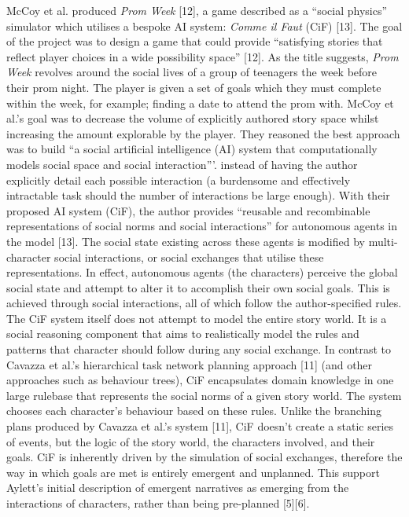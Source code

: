 \documentclass{sig-alternate-05-2015}
\begin{document}
\newline McCoy et al. produced \textit{Prom Week} [12], a game described as a ``social physics'' simulator which utilises a bespoke AI system: \textit{Comme il Faut} (CiF) [13]. The goal of the project was to design a game that could provide ``satisfying stories that reflect player choices in a wide possibility space'' [12].
As the title suggests, \textit{Prom Week} revolves around the social lives of a group of teenagers the week before their prom night. The player is given a set of goals which they must complete within the week, for example; finding a date to attend the prom with. McCoy et al.'s goal was to decrease the volume of explicitly authored story space whilst increasing the amount explorable by the player. They reasoned the best approach was to build ``a social artificial intelligence (AI) system that computationally models social space and social interaction'''. instead of having the author explicitly detail each possible interaction (a burdensome and effectively intractable task should the number of interactions be large enough). With their proposed AI system (CiF),  the author provides ``reusable and recombinable representations of social norms and social interactions'' for autonomous agents in the model [13]. The social state existing across these agents is modified by multi-character social interactions, or social exchanges that utilise these representations. In effect, autonomous agents (the characters) perceive the global social state and attempt to alter it to accomplish their own social goals. This is achieved through social interactions, all of which follow the author-specified rules.\\

\newline The CiF system itself does not attempt to model the entire story world. It is a social reasoning component that aims to realistically model the rules and patterns that character should follow during any social exchange. In contrast to Cavazza et al.'s hierarchical task network planning approach [11] (and other approaches such as behaviour trees), CiF encapsulates domain knowledge in one large rulebase that represents the social norms of a given story world. The system chooses each character's behaviour based on these rules. Unlike the branching plans produced by Cavazza et al.'s system [11], CiF doesn't create a static series of events, but the logic of the story world, the characters involved, and their goals. CiF is inherently driven by the simulation of social exchanges, therefore the way in which goals are met is entirely emergent and unplanned. This support Aylett's initial description of emergent narratives as emerging from the interactions of characters, rather than being pre-planned [5][6].
\end{document}
